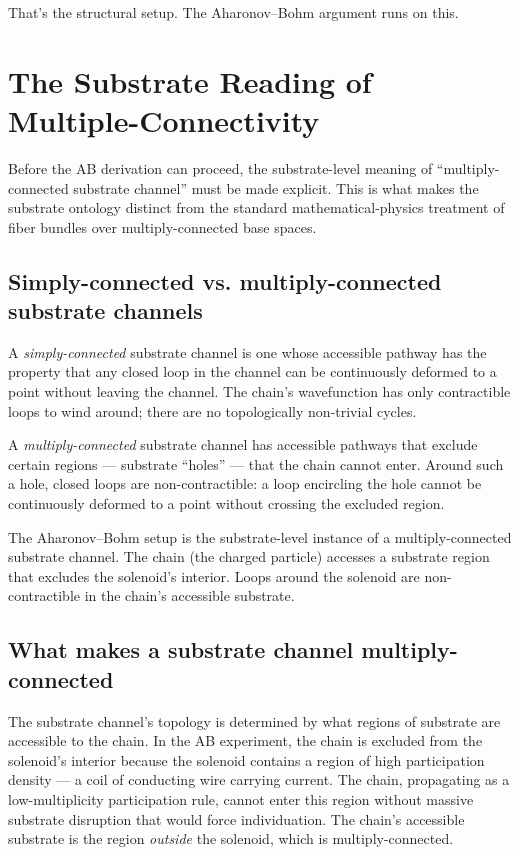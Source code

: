 \documentclass[11pt,a4paper]{article}
\begin{document}
That's the structural setup. The Aharonov--Bohm argument runs on this.

\section{The Substrate Reading of Multiple-Connectivity}

Before the AB derivation can proceed, the substrate-level meaning of ``multiply-connected substrate channel'' must be made explicit. This is what makes the substrate ontology distinct from the standard mathematical-physics treatment of fiber bundles over multiply-connected base spaces.

\subsection{Simply-connected vs. multiply-connected substrate channels}

A \emph{simply-connected} substrate channel is one whose accessible pathway has the property that any closed loop in the channel can be continuously deformed to a point without leaving the channel. The chain's wavefunction has only contractible loops to wind around; there are no topologically non-trivial cycles.

A \emph{multiply-connected} substrate channel has accessible pathways that exclude certain regions --- substrate ``holes'' --- that the chain cannot enter. Around such a hole, closed loops are non-contractible: a loop encircling the hole cannot be continuously deformed to a point without crossing the excluded region.

The Aharonov--Bohm setup is the substrate-level instance of a multiply-connected substrate channel. The chain (the charged particle) accesses a substrate region that excludes the solenoid's interior. Loops around the solenoid are non-contractible in the chain's accessible substrate.

\subsection{What makes a substrate channel multiply-connected}

The substrate channel's topology is determined by what regions of substrate are accessible to the chain. In the AB experiment, the chain is excluded from the solenoid's interior because the solenoid contains a region of high participation density --- a coil of conducting wire carrying current. The chain, propagating as a low-multiplicity participation rule, cannot enter this region without massive substrate disruption that would force individuation. The chain's accessible substrate is the region \emph{outside} the solenoid, which is multiply-connected.
\end{document}
